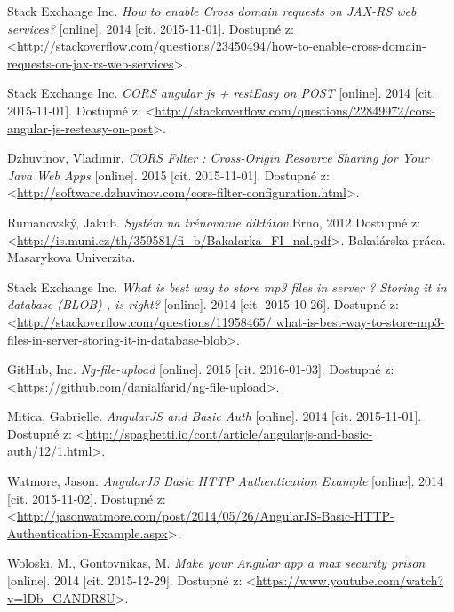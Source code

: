 \documentclass[12pt,oneside]{fithesis2}
\begin{document}
\begin{thebibliography}{59}
  		Stack Exchange Inc.
  		\emph{How to enable Cross domain requests on JAX-RS web services?}
  		[online].
  		2014
  		[cit. 2015-11-01].
  		Dostupné z: <\url{http://stackoverflow.com/questions/23450494/how-to-enable-cross-domain-requests-on-jax-rs-web-services}>.  	
  		
  		Stack Exchange Inc.
  		\emph{CORS angular js + restEasy on POST}
  		[online].
  		2014
  		[cit. 2015-11-01].
  		Dostupné z: <\url{http://stackoverflow.com/questions/22849972/cors-angular-js-resteasy-on-post}>.
		  	
  		Dzhuvinov, Vladimir.
  		\emph{CORS Filter : Cross-Origin Resource Sharing for Your Java Web Apps}
  		[online].
  		2015
  		[cit. 2015-11-01].
  		Dostupné z: <\url{http://software.dzhuvinov.com/cors-filter-configuration.html}>.  			
  			
  		Rumanovský, Jakub.
  		\emph{Systém na trénovanie diktátov}
  		Brno, 
  		2012
  		Dostupné z: <\url{http://is.muni.cz/th/359581/fi_b/Bakalarka_FI_nal.pdf}>.
  		Bakalárska práca. Masarykova Univerzita.
  		  			
  		Stack Exchange Inc.
  		\emph{What is best way to store mp3 files in server ? Storing it in database (BLOB) , is right?}
  		[online].
  		2014
  		[cit. 2015-10-26].
  		Dostupné z: <\url{http://stackoverflow.com/questions/11958465/
  		what-is-best-way-to-store-mp3-files-in-server-storing-it-in-database-blob}>.  		  			
  		  			
  		  			
  		GitHub, Inc.
  		\emph{Ng-file-upload}
  		[online].
  		2015
  		[cit. 2016-01-03].
  		Dostupné z: <\url{https://github.com/danialfarid/ng-file-upload}>.
  		
  		Mitica, Gabrielle.
  		\emph{AngularJS and Basic Auth}
  		[online].
  		2014
  		[cit. 2015-11-01].
  		Dostupné z: <\url{http://spaghetti.io/cont/article/angularjs-and-basic-auth/12/1.html}>.  		
  		
  		Watmore, Jason.
  		\emph{AngularJS Basic HTTP Authentication Example}
  		[online].
  		2014
  		[cit. 2015-11-02].
  		Dostupné z: <\url{http://jasonwatmore.com/post/2014/05/26/AngularJS-Basic-HTTP-Authentication-Example.aspx}>.
  		
  		Woloski, M., Gontovnikas, M.
  		\emph{Make your Angular app a max security prison}
  		[online].
  		2014
  		[cit. 2015-12-29].
  		Dostupné z: <\url{https://www.youtube.com/watch?v=lDb_GANDR8U}>.
  		

\end{thebibliography}
\end{document}
